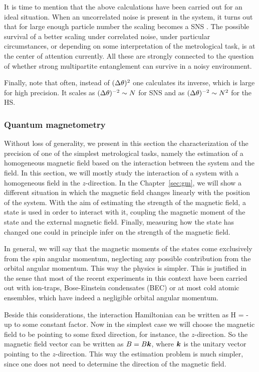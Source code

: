 It is time to mention that the above calculations have been carried out for an ideal situation.
When an uncorrelated noise is present in the system, it turns out that for large enough particle number the scaling becomes a SNS \cite{Demkowicz-Dobrzanski2012}.
The possible survival of a better scaling under correlated noise, under particular circumstances, or depending on some interpretation of the metrological task, is at the center of attention currently.
All these are strongly connected to the question of whether strong multipartite entanglement can survive in a noisy environment.

Finally, note that often, instead of $(\Delta \theta )^2$ one calculates its inverse, which is large for high precision.
It scales as $(\Delta \theta )^{-2}\sim N$ for SNS and as $(\Delta \theta )^{-2}\sim N^2$ for the HS.

\subsubsection{Quantum magnetometry}
\label{sec:bg-quantum-magnetometry}

Without loss of generality, we present in this section the characterization of the precision of one of the simplest metrological tasks, namely the estimation of a homogeneous magnetic field based on the interaction between the system and the field.
In this section, we will mostly study the interaction of a system with a homogeneous field in the $z$-direction.
In the Chapter~\ref{sec:gm}, we will show a different situation in which the magnetic field changes linearly with the position of the system.
With the aim of estimating the strength of the magnetic field, a state is used in order to interact with it, coupling the magnetic moment of the state and the external magnetic field.
Finally, measuring how the state has changed one could in principle infer on the strength of the magnetic field.

In general, we will say that the magnetic moments of the states come exclusively from the spin angular momentum, neglecting any possible contribution from the orbital angular momentum.
This way the physics is simpler.
This is justified in the sense that most of the recent experiments in this context have been carried out with ion-traps, Bose-Einstein condensates (BEC) or at most cold atomic ensembles, which have indeed a negligible orbital angular momentum.

Beside this considerations, the interaction Hamiltonian can be written as
\be
  H = - \bs{\mu} \cdot {}
\ee
up to some constant factor.
Now in the simplest case we will choose the magnetic field to be pointing to some fixed direction, for instance, the $z$-direction.
So the magnetic field vector can be written as ${B}=B\boldsymbol{k}$, where $\boldsymbol{k}$ is the unitary vector pointing to the $z$-direction.
This way the estimation problem is much simpler, since one does not need to determine the direction of the magnetic field.

